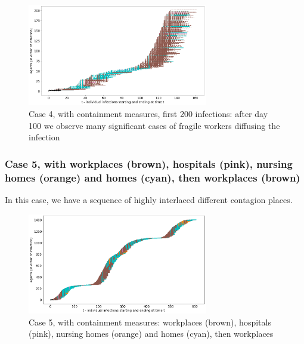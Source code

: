 \documentclass[graybox]{svmult}
\begin{document}
\begin{figure}[t]
\begin{center}
\includegraphics[width=0.7\textwidth]{with6b.png}%
\caption{Case 4, with containment measures, first 200 infections: after day 100 we observe many significant cases of fragile workers diffusing the infection}
\label{6b}
\end{center}
\end{figure}


\subsubsection{Case 5, with workplaces (brown), hospitals (pink), nursing homes (orange) and homes (cyan), then workplaces (brown)}
\label{c5}

In this case, we have a sequence of highly interlaced different contagion places.

\begin{figure}[t]
\begin{center}
\includegraphics[width=0.7\textwidth]{with7a.png}%
\caption{Case 5, with containment measures: workplaces (brown), hospitals (pink), nursing homes (orange) and homes (cyan), then workplaces}
\label{7a}
\end{center}
\end{figure}
\end{document}

